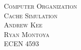 \begin{titlepage}
\begin{center} 
\vspace*{2cm}
\textsc{\huge Computer Organization}\\[1cm]
\textsc{\LARGE Cache Simulation}\\[13cm]

\textsc{\large Andrew Kee}\\[0.25cm]
\textsc{\large Ryan Montoya} \\[0.25cm]
\textsc{ECEN 4593}

\end{center}
\end{titlepage}